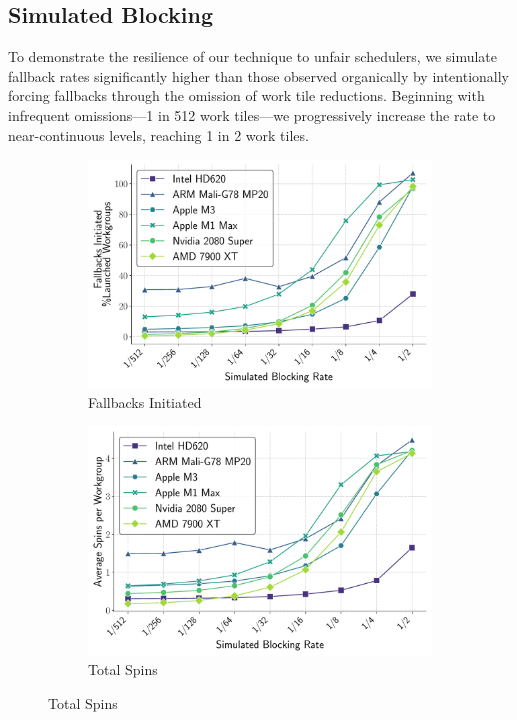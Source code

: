 \documentclass[sigconf]{acmart}
\begin{document}
\subsection{Simulated Blocking}
To demonstrate the resilience of our technique to unfair schedulers, we simulate fallback rates significantly higher than those observed organically by intentionally forcing fallbacks through the omission of work tile reductions. Beginning with infrequent omissions---1 in 512 work tiles---we progressively increase the rate to near-continuous levels, reaching 1 in 2 work tiles.
\begin{figure}[t]
  \centering
  \begin{subfigure}[t]{0.48\linewidth}
    \centering
    \includegraphics[width=\linewidth]{graphics/fallbacksInitiated_plot.pdf}
    \caption{Fallbacks Initiated}
    \label{fig:fallbacks_initiated}
  \end{subfigure}\hfill
  \begin{subfigure}[t]{0.48\linewidth}
    \centering
    \includegraphics[width=\linewidth]{graphics/totalSpins_plot.pdf}
    \caption{Total Spins}
    \label{fig:total_spins}
  \end{subfigure}


\end{figure}
\end{document}
